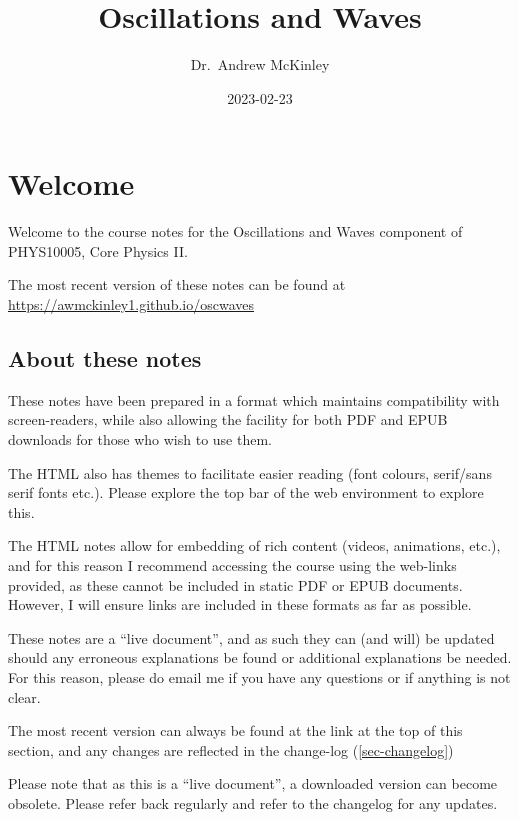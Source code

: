 \documentclass[
]{book}
\title{Oscillations and Waves}
\author{Dr.~Andrew McKinley}
\date{2023-02-23}
\begin{document}
\maketitle

{
\setcounter{tocdepth}{1}
\tableofcontents
}
\hypertarget{welcome}{%
\chapter*{Welcome}\label{welcome}}

Welcome to the course notes for the Oscillations and Waves component of PHYS10005, Core Physics II.

The most recent version of these notes can be found at \url{https://awmckinley1.github.io/oscwaves}

\hypertarget{about-these-notes}{%
\section*{About these notes}\label{about-these-notes}}

These notes have been prepared in a format which maintains compatibility with screen-readers, while also allowing the facility for both PDF and EPUB downloads for those who wish to use them.

The HTML also has themes to facilitate easier reading (font colours, serif/sans serif fonts etc.). Please explore the top bar of the web environment to explore this.

The HTML notes allow for embedding of rich content (videos, animations, etc.), and for this reason I recommend accessing the course using the web-links provided, as these cannot be included in static PDF or EPUB documents. However, I will ensure links are included in these formats as far as possible.

These notes are a ``live document'', and as such they can (and will) be updated should any erroneous explanations be found or additional explanations be needed. For this reason, please do email me if you have any questions or if anything is not clear.

The most recent version can always be found at the link at the top of this section, and any changes are reflected in the change-log (\ref{sec-changelog})

Please note that as this is a ``live document'', a downloaded version can become obsolete. Please refer back regularly and refer to the changelog for any updates.
\end{document}
